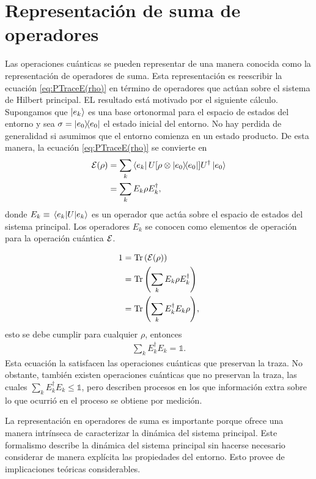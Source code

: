 \section{Representación de suma de operadores}
Las operaciones cuánticas se pueden representar de una manera
conocida como la representación de operadores de suma. Esta
representación es reescribir la ecuación \eqref{eq:PTraceE(rho)}
en término de operadores que actúan sobre el sistema de Hilbert
principal. EL resultado está motivado por el siguiente cálculo. 
Supongamos que $\ket{e_k}$ es una base ortonormal para el
espacio de estados del entorno y sea $\sigma = \dyad{e_0}{e_0}$
el estado inicial del entorno. No hay perdida de generalidad si 
asumimos que el entorno comienza en un estado producto. De 
esta manera, la ecuación \eqref{eq:PTraceE(rho)} se convierte en
\begin{align*}
	\E (\rho) &= \sum _k \bra{e_k}U\qty[\rho \otimes \dyad{e_0}{e_0}]U^{\dagger}
	\ket{e_0} \\
						&= \sum _k E_k\rho E_k^{\dagger},
\end{align*}
donde $E_k\equiv \matrixel{e_k}{U}{e_k}$ es un operador que actúa
sobre el espacio de estados del sistema principal. Los operadores
$E_k$ se conocen como elementos de operación para la operación 
cuántica $\mathcal{E}$. 

\begin{align*}
	1 &= \Tr \qty(\mathcal{E}(\rho)) \\
		&= \Tr \qty(\sum _k E_k\rho E_k^{\dagger}) \\
		&= \Tr \qty(\sum _k E_k^{\dagger}E_k \rho),
\end{align*}
esto se debe cumplir para cualquier $\rho$, entonces 
\begin{align}
	\sum _k E_k^{\dagger}E_k = \mathbb{1}.
\end{align}
Esta ecuación la satisfacen las operaciones cuánticas que preservan
la traza. No obstante, también existen operaciones cuánticas que 
no preservan la traza, las cuales $\sum _kE_k^{\dagger}E_k\leq \mathbb{1}$,
pero describen procesos en los que información extra sobre lo que ocurrió
en el proceso se obtiene por medición. 

La representación en operadores de suma es importante porque ofrece
una manera intrínseca de caracterizar la dinámica del sistema principal. 
Este formalismo describe la dinámica del sistema principal sin hacerse
necesario considerar de manera explícita las propiedades del entorno. 
Esto provee de implicaciones teóricas considerables. 

